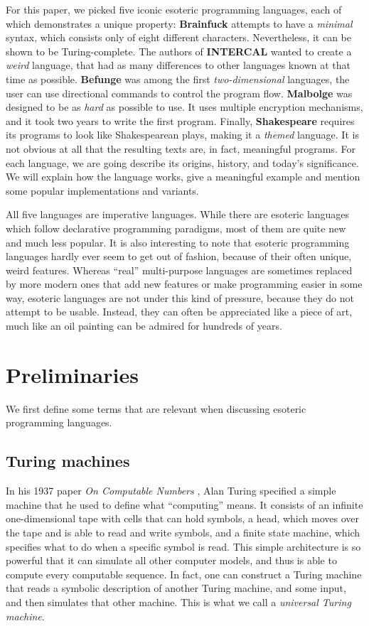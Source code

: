 \documentclass{sig-alternate}
\begin{document}
For this paper, we picked five iconic esoteric programming languages, each of which demonstrates a unique property:
\textbf{Brainfuck} attempts to have a \textit{minimal} syntax, which consists only of eight different characters. Nevertheless, it can be shown to be Turing-complete. The authors of \textbf{INTERCAL} wanted to create a \textit{weird} language, that had as many differences to other languages known at that time as possible. \textbf{Befunge} was among the first \textit{two-dimensional} languages, the user can use directional commands to control the program flow. \textbf{Malbolge} was designed to be as \textit{hard} as possible to use. It uses multiple encryption mechanisms, and it took two years to write the first program. Finally, \textbf{Shakespeare} requires its programs to look like Shakespearean plays, making it a \textit{themed} language. It is not obvious at all that the resulting texts are, in fact, meaningful programs. For each language, we are going describe its origins, history, and today's significance. We will explain how the language works, give a meaningful example and mention some popular implementations and variants. 

All five languages are imperative languages. While there are esoteric languages which follow declarative programming paradigms, most of them are quite new and much less popular. It is also interesting to note that esoteric programming languages hardly ever seem to get out of fashion, because of their often unique, weird features. Whereas “real” multi-purpose languages are sometimes replaced by more modern ones that add new features or make programming easier in some way, esoteric languages are not under this kind of pressure, because they do not attempt to be usable. Instead, they can often be appreciated like a piece of art, much like an oil painting can be admired for hundreds of years.

\section{Preliminaries}

We first define some terms that are relevant when discussing esoteric programming languages.

\subsection{Turing machines}

In his 1937 paper \emph{On Computable Numbers} \cite{turing1937computable}, Alan Turing specified a simple machine that he used to define what “computing” means. It consists of an infinite one-dimensional tape with cells that can hold symbols, a head, which moves over the tape and is able to read and write symbols, and a finite state machine, which specifies what to do when a specific symbol is read. This simple architecture is so powerful that it can simulate all other computer models, and thus is able to compute every computable sequence.
In fact, one can construct a Turing machine that reads a symbolic description of another Turing machine, and some input, and then simulates that other machine. This is what we call a \emph{universal Turing machine}.
\end{document}
